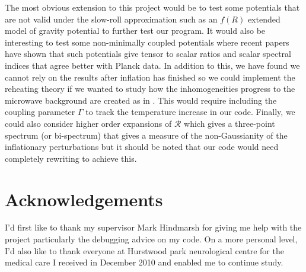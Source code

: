 \documentclass[a4paper,12pt,twoside]{report}
\newcommand{\linespacing}{1.5}
\renewcommand{\baselinestretch}{\linespacing}
\begin{document}
The most obvious extension to this project would be to test some potentials that are not valid under the slow-roll approximation such as an $f(R)$ extended model of gravity potential \cite{Starobinsky:1980te} to further test our program. It would also be interesting to test some non-minimally coupled potentials \cite{Fakir:1990eg} where recent papers \cite{Linde:2011nh, Kallosh:2014xwa} have shown that such potentials give tensor to scalar ratios and scalar spectral indices that agree better with Planck data. In addition to this, we have found we cannot rely on the results after inflation has finished so we could implement the reheating theory if we wanted to study how the inhomogeneities progress to the microwave background are created as in \cite{Lewis:2002ah}. This would require including the coupling parameter $\Gamma$ to track the temperature increase in our code. Finally, we could also consider higher order expansions of $\mathcal{R}$ which gives a three-point spectrum (or bi-spectrum) that gives a measure of the non-Gaussianity of the inflationary perturbations \cite{Maldacena:2002vr, Seery:2008qj} but it should be noted that our code would need completely rewriting to achieve this.




\clearpage
{}
{}



\chapter*{Acknowledgements}
\renewcommand{\baselinestretch}{\linespacing}
\small\normalsize

I'd first like to thank my supervisor Mark Hindmarsh for giving me help with the project particularly the debugging advice on my code. On a more personal level, I'd also like to thank everyone at Hurstwood park neurological centre for the medical care I received in December 2010 and enabled me to continue study.



\end{document}
